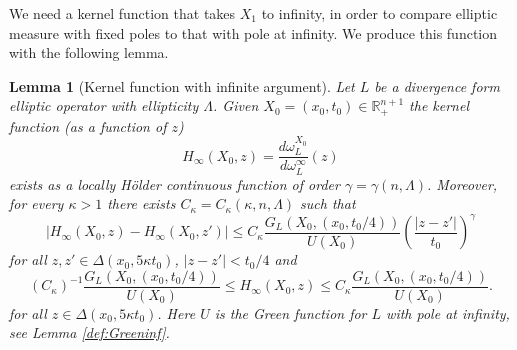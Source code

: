 \documentclass[11pt, a4paper,leqno]{amsart}
\theoremstyle{plain}
\newtheorem{lemma}[equation]{Lemma}
\theoremstyle{definition}
\theoremstyle{remark}
\numberwithin{equation}{section}
\newcommand{\ree}{\mathbb{R}^{n+1}}
\newcommand{\hm}{\omega}
\begin{document}
We need a kernel function that takes $X_1$ to infinity, in order to compare elliptic measure with fixed poles to that with pole at infinity. We produce this function with the following lemma.
\begin{lemma}[Kernel function with infinite argument]\label{infkernfnlem.lem}
Let $L$ be a divergence form elliptic operator with ellipticity $\Lambda$. Given $X_0 = (x_0, t_0) \in \ree_+$ the kernel function (as a function of $z$) 
\[H_\infty(X_0,z) = \frac{d\hm^{X_0}_L}{d\hm^{\infty}_L} (z)\]
exists as a locally H\"older continuous function of order $\gamma = \gamma(n,\Lambda)$. Moreover, for every $\kappa > 1$ there exists $C_\kappa = C_\kappa(\kappa, n, \Lambda)$ such that
\begin{equation}\label{HCinfkern.eq}
|H_\infty(X_0, z) - H_\infty(X_0, z')| \le C_\kappa \frac{G_L(X_0, (x_0, t_0/4))}{U(X_0)} \left(\frac{|z - z'|}{t_0}\right)^\gamma 
\end{equation}
for all $z,z' \in \Delta(x_0, 5\kappa t_0)$, $|z - z'| < t_0/4$ and
\begin{equation}\label{compinfkern.eq}
(C_\kappa)^{-1} \frac{G_L(X_0, (x_0, t_0/4))}{U(X_0)} \le H_\infty(X_0, z) \le C_\kappa \frac{G_L(X_0, (x_0, t_0/4))}{U(X_0)}.
\end{equation}
for all $z \in \Delta(x_0, 5\kappa t_0)$. Here $U$ is the Green function for $L$ with pole at infinity, see Lemma \ref{def:Greeninf}.
\end{lemma}
\end{document}
